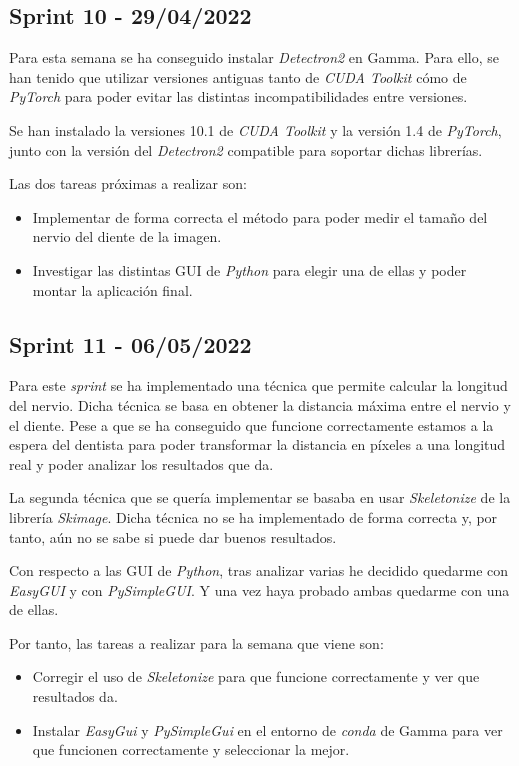 \subsection{Sprint 10 - 29/04/2022}
Para esta semana se ha conseguido instalar \emph{Detectron2} en Gamma. Para ello, se han tenido que utilizar versiones antiguas tanto de \emph{CUDA Toolkit} cómo de  \emph{PyTorch} para poder evitar las distintas incompatibilidades entre versiones.

Se han instalado la versiones 10.1 de \emph{CUDA Toolkit} y la versión 1.4 de \emph{PyTorch}, junto con la versión del \emph{Detectron2} compatible para soportar dichas librerías.

Las dos tareas próximas a realizar son:
\begin{itemize}
    \item Implementar de forma correcta el método para poder medir el tamaño del nervio del diente de la imagen.
    \item Investigar las distintas GUI de \emph{Python} para elegir una de ellas y poder montar la aplicación final.  
\end{itemize}
\subsection{Sprint 11 - 06/05/2022}
Para este \emph{sprint} se ha implementado una técnica que permite calcular la longitud del nervio. Dicha técnica se basa en obtener la distancia máxima entre el nervio y el diente. Pese a que se ha conseguido que funcione correctamente estamos a la espera del dentista para poder transformar la distancia en píxeles a una longitud real y poder analizar los resultados que da.

La segunda técnica que se quería implementar se basaba en usar \emph{Skeletonize} de la librería \emph{Skimage}. Dicha técnica no se ha implementado de forma correcta y, por tanto, aún no se sabe si puede dar buenos resultados.

Con respecto a las GUI de \emph{Python}, tras analizar varias he decidido quedarme con \emph{EasyGUI} y con \emph{PySimpleGUI}. Y una vez haya probado ambas quedarme con una de ellas.

Por tanto, las tareas a realizar para la semana que viene son:
\begin{itemize}
    \item Corregir el uso de \emph{Skeletonize} para que funcione correctamente y ver que resultados da.
    \item Instalar \emph{EasyGui} y \emph{PySimpleGui} en el entorno de \emph{conda} de Gamma para ver que funcionen correctamente y seleccionar la mejor.
\end{itemize}

